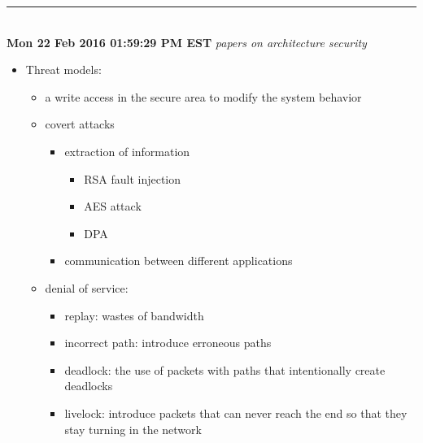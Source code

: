 \documentclass[]{article}
\begin{document}
\rule[-0.1cm]{7.5in}{0.01cm}\\
\noindent \textbf{Mon 22 Feb 2016 01:59:29 PM EST}
\textit{papers on architecture security}
\begin{itemize}
    \item \cite{diguet2007noc} Threat models:
        \begin{itemize}
            \item a write access in the secure area to modify the system behavior
            \item covert attacks
                \begin{itemize}
                    \item extraction of information
                        \begin{itemize}
                            \item RSA fault injection\cite{pellegrini2010fault} 
                            \item AES attack\cite{moradi2006generalized}
                            \item DPA \cite{kocher2011introduction}
                        \end{itemize}
                    \item communication between different applications \cite{wang2012efficient}
                \end{itemize}
            \item denial of service:
                \begin{itemize}
                    \item replay: wastes of bandwidth
                    \item incorrect path: introduce erroneous paths
                    \item deadlock: the use of packets with paths that intentionally create deadlocks
                    \item livelock: introduce packets that can never reach the end so that they stay turning in the network
                \end{itemize}
        \end{itemize}
\end{itemize}
\end{document}
